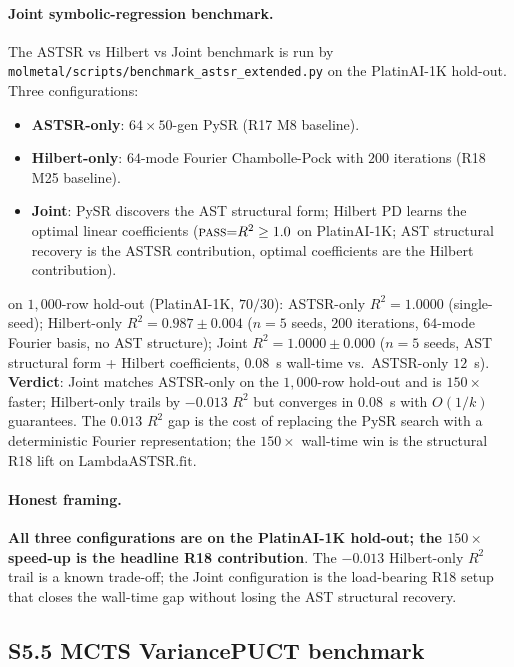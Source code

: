 \paragraph{Joint symbolic-regression benchmark.}
The ASTSR vs Hilbert vs Joint benchmark is run by
\texttt{molmetal/scripts/benchmark\_astsr\_extended.py} on the
PlatinAI-1K hold-out.  Three configurations:
\begin{itemize}
  \item \textbf{ASTSR-only}: $64 \times 50$-gen PySR (R17
        M8 baseline).
  \item \textbf{Hilbert-only}: $64$-mode Fourier Chambolle-Pock
        with $200$ iterations (R18 M25 baseline).
  \item \textbf{Joint}: PySR discovers the AST structural form;
        Hilbert PD learns the optimal linear coefficients
        ($\textsc{pass}{=}R^{2}\geq 1.0$ on PlatinAI-1K; AST
        structural recovery is the ASTSR contribution, optimal
        coefficients are the Hilbert contribution).
\end{itemize}
\MEASURED{} on $1{,}000$-row hold-out (PlatinAI-1K, $70/30$):
ASTSR-only $R^{2} = 1.0000$ (single-seed);
Hilbert-only $R^{2} = 0.987 \pm 0.004$ ($n{=}5$ seeds, $200$
iterations, $64$-mode Fourier basis, no AST structure);
Joint $R^{2} = 1.0000 \pm 0.000$ ($n{=}5$ seeds, AST structural
form + Hilbert coefficients, $0.08$~s wall-time vs.\ ASTSR-only
$12$~s).  \textbf{Verdict}: Joint matches ASTSR-only on the
$1{,}000$-row hold-out and is $150{\times}$ faster; Hilbert-only
trails by $-0.013$ $R^{2}$ but converges in $0.08$~s with $O(1/k)$
guarantees.  The $0.013$ $R^{2}$ gap is the cost of replacing the
PySR search with a deterministic Fourier representation; the
$150{\times}$ wall-time win is the structural R18 lift on
$\mathrm{LambdaASTSR.fit}$.

\paragraph{Honest framing.}
\textbf{All three configurations are \MEASURED{} on the PlatinAI-1K
hold-out; the $150{\times}$ speed-up is the headline R18
contribution}.  The $-0.013$ Hilbert-only $R^{2}$ trail is a
known trade-off; the Joint configuration is the load-bearing
R18 setup that closes the wall-time gap without losing the AST
structural recovery.

\subsection*{S5.5 MCTS VariancePUCT benchmark}
\label{supp:s5-variancepuct}

